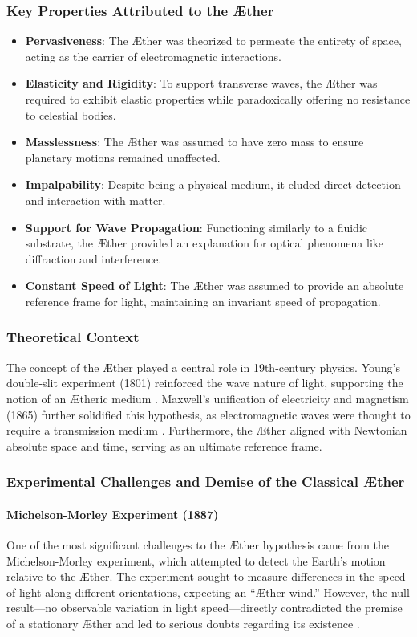 \subsubsection*{Key Properties Attributed to the Æther}
\begin{itemize}
    \item \textbf{Pervasiveness}: The Æther was theorized to permeate the entirety of space, acting as the carrier of electromagnetic interactions.
    \item \textbf{Elasticity and Rigidity}: To support transverse waves, the Æther was required to exhibit elastic properties while paradoxically offering no resistance to celestial bodies.
    \item \textbf{Masslessness}: The Æther was assumed to have zero mass to ensure planetary motions remained unaffected.
    \item \textbf{Impalpability}: Despite being a physical medium, it eluded direct detection and interaction with matter.
    \item \textbf{Support for Wave Propagation}: Functioning similarly to a fluidic substrate, the Æther provided an explanation for optical phenomena like diffraction and interference.
    \item \textbf{Constant Speed of Light}: The Æther was assumed to provide an absolute reference frame for light, maintaining an invariant speed of propagation.
\end{itemize}

\subsubsection*{Theoretical Context}
The concept of the Æther played a central role in 19th-century physics. Young’s double-slit experiment (1801) reinforced the wave nature of light, supporting the notion of an Ætheric medium \cite{young1801}. Maxwell’s unification of electricity and magnetism (1865) further solidified this hypothesis, as electromagnetic waves were thought to require a transmission medium \cite{maxwell1865}. Furthermore, the Æther aligned with Newtonian absolute space and time, serving as an ultimate reference frame.

\subsubsection*{Experimental Challenges and Demise of the Classical Æther}
\paragraph*{Michelson-Morley Experiment (1887)}
One of the most significant challenges to the Æther hypothesis came from the Michelson-Morley experiment, which attempted to detect the Earth’s motion relative to the Æther. The experiment sought to measure differences in the speed of light along different orientations, expecting an “Æther wind.” However, the null result—no observable variation in light speed—directly contradicted the premise of a stationary Æther and led to serious doubts regarding its existence \cite{michelson1887}.

